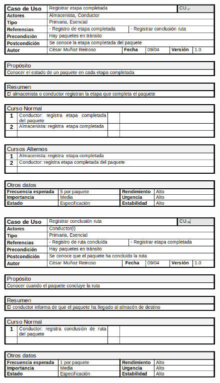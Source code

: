 \begin{figure}[H]
	\centering
	\includegraphics[width=16cm]{37}
\end{figure}
\begin{figure}[H]
	\centering
	\includegraphics[width=16cm]{38}
\end{figure}
